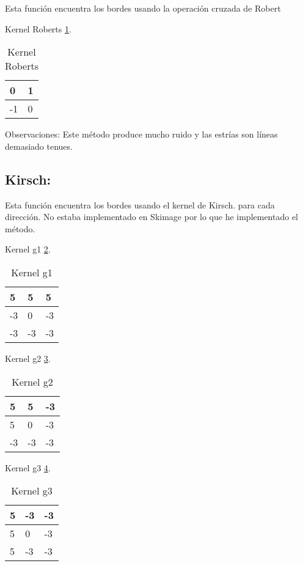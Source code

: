 Esta función encuentra los bordes usando la operación cruzada de Robert

Kernel Roberts \ref{F_k5}.
\begin{table}[]
	\centering
	\caption{Kernel Roberts}
	\label{F_k5}
	\begin{tabular}{|l|l|}
		\hline
		0  & 1 \\ \hline
		-1 & 0 \\ \hline
	\end{tabular}
\end{table}




Observaciones:
Este método produce mucho ruido y las estrías son líneas demasiado tenues.

\subsection{Kirsch:}
Esta función encuentra los bordes usando el kernel de Kirsch.
para cada dirección.
No estaba implementado en Skimage por lo que he implementado el método.

Kernel g1 \ref{F_k6_1}.
\begin{table}[]
	\centering
	\caption{Kernel g1}
	\label{F_k6_1}
	\begin{tabular}{|l|l|l|}
		\hline
		5  & 5  & 5  \\ \hline
		-3 & 0  & -3 \\ \hline
		-3 & -3 & -3 \\ \hline
	\end{tabular}
\end{table}

Kernel g2 \ref{F_k6_2}.
\begin{table}[]
	\centering
	\caption{Kernel g2}
	\label{F_k6_2}
	\begin{tabular}{|l|l|l|}
		\hline
		5  & 5  & -3  \\ \hline
		5 & 0  & -3 \\ \hline
		-3 & -3 & -3 \\ \hline
	\end{tabular}
\end{table}


Kernel g3 \ref{F_k6_3}.

\begin{table}[]
	\centering
	\caption{Kernel g3}
	\label{F_k6_3}
	\begin{tabular}{|l|l|l|}
		\hline
		5  & -3 & -3  \\ \hline
		5 & 0  & -3 \\ \hline
		5 & -3 & -3 \\ \hline
	\end{tabular}
\end{table}

